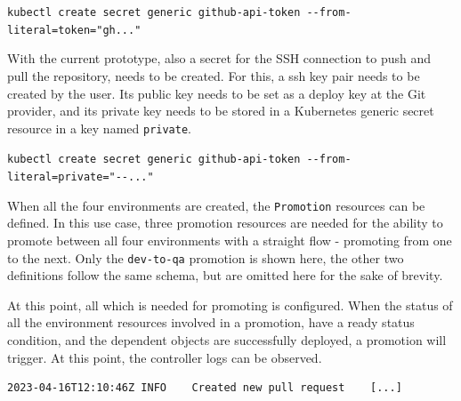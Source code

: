 \lstinline|kubectl create secret generic github-api-token --from-literal=token="gh..."|

With the current prototype, also a secret for the SSH connection to push and pull
the repository, needs to be created.
For this, a ssh key pair needs to be created by the user. Its public key needs to 
be set as a deploy key at the Git provider,
and its private key needs to be stored in a
Kubernetes generic secret resource in a key named \lstinline|private|.

\lstinline|kubectl create secret generic github-api-token --from-literal=private="--..."|

When all the four environments are created, the \lstinline|Promotion| resources
can be defined.
In this use case, three promotion resources are needed for the ability to
promote between all four environments with a straight flow - promoting from one to the next.
Only the \lstinline|dev-to-qa| promotion is shown here,
the other two definitions follow the same schema,
but are omitted here for the sake of brevity.



%
%
%





At this point, all which is needed for promoting is configured.
When the status of all the environment resources involved in a promotion,
have a ready status condition,
and the dependent objects are successfully deployed,
a promotion will trigger.
%
At this point, the controller logs can be observed.

\begin{lstlisting}
2023-04-16T12:10:46Z INFO    Created new pull request    [...]
\end{lstlisting}

